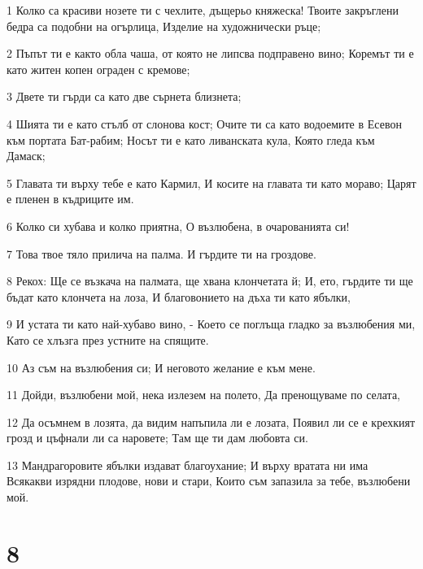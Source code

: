 \par 1 Колко са красиви нозете ти с чехлите, дъщерьо княжеска! Твоите закръглени бедра са подобни на огърлица, Изделие на художнически ръце;
\par 2 Пъпът ти е както обла чаша, от която не липсва подправено вино; Коремът ти е като житен копен ограден с кремове;
\par 3 Двете ти гърди са като две сърнета близнета;
\par 4 Шията ти е като стълб от слонова кост; Очите ти са като водоемите в Есевон към портата Бат-рабим; Носът ти е като ливанската кула, Която гледа към Дамаск;
\par 5 Главата ти върху тебе е като Кармил, И косите на главата ти като мораво; Царят е пленен в къдриците им.
\par 6 Колко си хубава и колко приятна, О възлюбена, в очарованията си!
\par 7 Това твое тяло прилича на палма. И гърдите ти на гроздове.
\par 8 Рекох: Ще се възкача на палмата, ще хвана клончетата й; И, ето, гърдите ти ще бъдат като клончета на лоза, И благовонието на дъха ти като ябълки,
\par 9 И устата ти като най-хубаво вино, - Което се поглъща гладко за възлюбения ми, Като се хлъзга през устните на спящите.
\par 10 Аз съм на възлюбения си; И неговото желание е към мене.
\par 11 Дойди, възлюбени мой, нека излезем на полето, Да пренощуваме по селата,
\par 12 Да осъмнем в лозята, да видим напъпила ли е лозата, Появил ли се е крехкият грозд и цъфнали ли са наровете; Там ще ти дам любовта си.
\par 13 Мандрагоровите ябълки издават благоухание; И върху вратата ни има Всякакви изрядни плодове, нови и стари, Които съм запазила за тебе, възлюбени мой.

\chapter{8}

